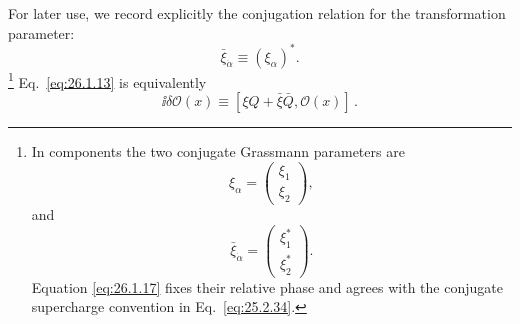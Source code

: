 For later use, we record explicitly the conjugation relation for the
transformation parameter:
\begin{equation}
  \bar\xi_{\dot\alpha}\equiv(\xi_\alpha)^* .
  \tag{26.1.17}\label{eq:26.1.17}
\end{equation}
\footnote{In components the two conjugate Grassmann parameters are
\[
  \xi_\alpha=
  \begin{pmatrix}\xi_1\\ \xi_2\end{pmatrix},
\]
and
\[
  \bar\xi_{\dot\alpha}=
  \begin{pmatrix}\xi_1^*\\ \xi_2^*\end{pmatrix}.
\]
Equation \eqref{eq:26.1.17} fixes their relative phase and agrees with the
conjugate supercharge convention in Eq.~\eqref{eq:25.2.34}.}
Eq.~\eqref{eq:26.1.13} is equivalently
\begin{equation}
  \ii\delta\mathcal{O}(x)\equiv
  [\xi Q+\bar\xi\bar Q,\mathcal{O}(x)]\,.
  \tag{26.1.18}\label{eq:26.1.18}
\end{equation}

